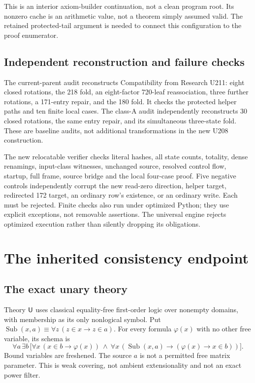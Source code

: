 \documentclass[11pt,letterpaper]{article}
\begin{document}
This is an interior axiom-builder continuation, not a clean program
root. Its nonzero cache is an arithmetic value, not a theorem simply
assumed valid. The retained protected-tail argument is needed to
connect this configuration to the proof enumerator.

\subsection{Independent reconstruction and failure checks}
The current-parent audit reconstructs Compatibility from Research U211:
eight closed rotations, the 218 fold, an eight-factor 720-leaf
reassociation, three further rotations, a 171-entry repair, and the
180 fold. It checks the protected helper paths and ten finite local
cases. The class-A audit independently reconstructs 30 closed rotations,
the same entry repair, and its simultaneous three-state fold. These
are baseline audits, not additional transformations in the new U208
construction.

The new relocatable verifier checks literal hashes, all state counts,
totality, dense renamings, input-class witnesses, unchanged source,
resolved control flow, startup, full frame, source bridge and the local
four-case proof. Five negative controls independently corrupt the
new read-zero direction, helper target, redirected 172 target, an
ordinary row's existence, or an ordinary write. Each must be rejected.
Finite checks also run under optimized Python; they use explicit
exceptions, not removable assertions. The universal engine rejects
optimized execution rather than silently dropping its obligations.

\section{The inherited consistency endpoint}
\subsection{The exact unary theory}
Theory $\mathsf U$ uses classical equality-free first-order logic over nonempty
domains, with membership as its only nonlogical symbol. Put
$\operatorname{Sub}(x,a)\equiv\forall z\,(z\in x\to z\in a)$.
For every formula $\varphi(x)$ with no other free variable, its schema is
\[
 \forall a\,\exists b\,
 \bigl[\forall x\,(x\in b\to\varphi(x))\ \land\
 \forall x\,(\operatorname{Sub}(x,a)\to(\varphi(x)\to x\in b))\bigr].
\]
Bound variables are freshened. The source $a$ is not a permitted free
matrix parameter. This is weak covering, not ambient extensionality
and not an exact power filter.
\end{document}
